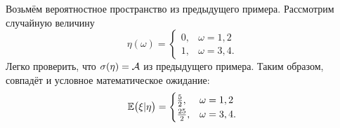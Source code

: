     \begin{exmp}
        Возьмём вероятностное пространство из предыдущего примера.
        Рассмотрим случайную величину 
        \begin{equation*}
            \eta(\omega) = \begin{cases} 
                0, & \omega = 1, 2 \\
                1, & \omega = 3, 4. 
            \end{cases}
        \end{equation*}
        Легко проверить, что $\sigma(\eta) = \mathcal{A}$ из предыдущего примера. 
        Таким образом, совпадёт и условное математическое ожидание:
        \begin{equation*}
            \operatorname{\mathbb{E}} \bigl( \xi | \eta \bigr) = \begin{cases}
                \frac{5}{2}, & \omega = 1, 2\\
                \frac{25}{2}, & \omega = 3, 4.
            \end{cases}
        \end{equation*}
    \end{exmp}        

